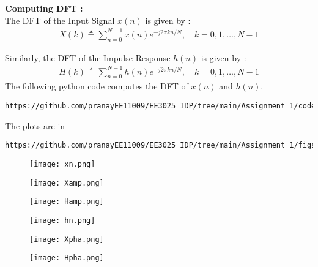 \documentclass[journal,12pt,twocolumn]{IEEEtran}
\begin{document}
\large{ \bf Computing DFT :} \\
The DFT of the Input Signal $x(n)$ is given by :
\begin{align}
    X(k) \triangleq \sum_{n=0}^{N-1}x(n)e^{-j2\pi kn/N},\quad k=0,1, \ldots, N-1 
\end{align}

Similarly, the DFT of the Impulse Response $h(n)$ is given by :
\begin{align}
    H(k) \triangleq \sum_{n=0}^{N-1}h(n)e^{-j2\pi kn/N},\quad k=0,1, \ldots, N-1 
\end{align}
The following python code computes the DFT of $x(n)$ and $h(n)$.
\begin{lstlisting}
https://github.com/pranayEE11009/EE3025_IDP/tree/main/Assignment_1/codes
\end{lstlisting}
The plots are in
\begin{lstlisting}
https://github.com/pranayEE11009/EE3025_IDP/tree/main/Assignment_1/figs
\end{lstlisting}

\newpage

\begin{figure}[h!]
    \centering
    \texttt{[image: xn.png]}
    \label{figs}
\end{figure}

\begin{figure}[h!]
    \centering
    \texttt{[image: Xamp.png]}
    \label{figs}
\end{figure}

\begin{figure}[h!]
    \centering
    \texttt{[image: Hamp.png]}
    \label{figs}
\end{figure}

\begin{figure}[h!]
    \centering
    \texttt{[image: hn.png]}
    \label{figs}
\end{figure}

\begin{figure}[h!]
    \centering
    \texttt{[image: Xpha.png]}
    \label{figs}
\end{figure}

\begin{figure}[h!]
    \centering
    \texttt{[image: Hpha.png]}
    \label{figs}
\end{figure}
\end{document}
